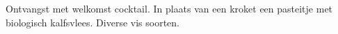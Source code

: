 Ontvangst met welkomst cocktail.
In plaats van een kroket een pasteitje met biologisch kalfsvlees.
Diverse vis soorten.
